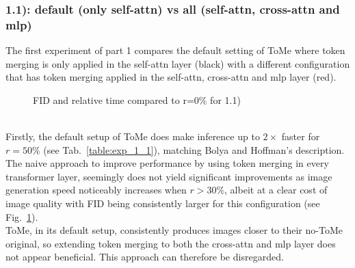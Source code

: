 \subsubsection*{1.1): default (only self-attn) vs all (self-attn, cross-attn and mlp)}
The first experiment of part 1 compares the default setting of ToMe where token merging is only applied in the self-attn layer (black) with a different configuration that has token merging applied in the self-attn, cross-attn and mlp layer (red). 
\begin{figure}[!htb]
\label{fig:exp_1_1}
   
   
\caption{FID and relative time compared to r=0\% for 1.1)}
\label{fig:exp_1_1}
\end{figure}\\
Firstly, the default setup of ToMe does make inference up to \(2 \times\) faster for \(r = 50\%\) (see Tab.~\ref{table:exp_1_1}), matching Bolya and Hoffman's description.\\
The naive approach to improve performance by using token merging in every transformer layer, seemingly does not yield significant improvements as image generation speed noticeably increases when \(r > 30\%\), albeit at a clear cost of image quality with FID being consistently larger for this configuration (see Fig.~\ref{fig:exp_1_1}). \\
ToMe, in its default setup, consistently produces images closer to their no-ToMe original, so extending token merging to both the cross-attn and mlp layer does not appear beneficial. This approach can therefore be disregarded.



